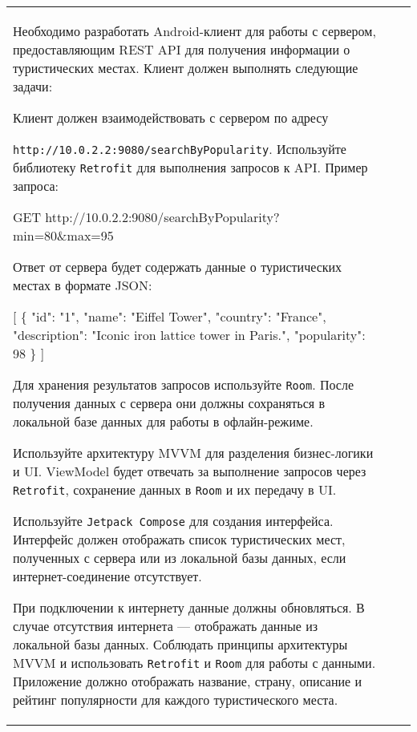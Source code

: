 \documentclass[a4paper]{article}
\begin{document}
\begin{tabular}{!{\vrule width 2pt}p{5cm}|p{6cm}|p{4cm}!{\vrule width 2pt}}
{\begin{minipage}{16cm}
\begin{enumerate}
Необходимо разработать Android-клиент для работы с сервером, предоставляющим REST API для получения информации о туристических местах. Клиент должен выполнять следующие задачи:

Клиент должен взаимодействовать с сервером по адресу 

\texttt{http://10.0.2.2:9080/searchByPopularity}. Используйте библиотеку \texttt{Retrofit} для выполнения запросов к API. Пример запроса:


GET http://10.0.2.2:9080/searchByPopularity?min=80\&max=95


Ответ от сервера будет содержать данные о туристических местах в формате JSON:


[
  \{
    "id": "1",
    "name": "Eiffel Tower",
    "country": "France",
    "description": "Iconic iron lattice tower in Paris.",
    "popularity": 98
  \}
]


Для хранения результатов запросов используйте \texttt{Room}. После получения данных с сервера они должны сохраняться в локальной базе данных для работы в офлайн-режиме.

Используйте архитектуру MVVM для разделения бизнес-логики и UI. ViewModel будет отвечать за выполнение запросов через \texttt{Retrofit}, сохранение данных в \texttt{Room} и их передачу в UI.

Используйте \texttt{Jetpack Compose} для создания интерфейса. Интерфейс должен отображать список туристических мест, полученных с сервера или из локальной базы данных, если интернет-соединение отсутствует.

При подключении к интернету данные должны обновляться.
В случае отсутствия интернета — отображать данные из локальной базы данных.
Соблюдать принципы архитектуры MVVM и использовать \texttt{Retrofit} и \texttt{Room} для работы с данными.
Приложение должно отображать название, страну, описание и рейтинг популярности для каждого туристического места. 
\end{enumerate}


\end{minipage}}
\end{tabular}
\end{document}
